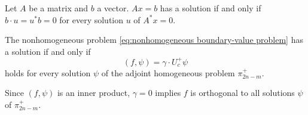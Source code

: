 \documentclass[11pt, oneside, a4paper]{article}
\begin{document}
\begin{prop}\label{prop:Ax=b has a solution iff condition}
    Let $A$ be a matrix and $b$ a vector. $Ax=b$ has a solution if and only if $b\cdot u=u^*b=0$ for every solution $u$ of $A^*x=0$.
\end{prop}

\begin{thm}\label{thm:nonhomogeneous problem has solution iff condition}
    The nonhomogeneous problem \ref{eq:nonhomogeneous boundary-value problem} has a solution if and only if
    \begin{equation}\label{eq:nonhomogeneous problem has solution iff condition}
        (f,\psi)=\gamma\cdot U_c^+\psi
    \end{equation}
    holds for every solution $\psi$ of the adjoint homogeneous problem $\pi_{2n-m}^+$.
\end{thm}
\begin{rmk}
    Since $(f,\psi)$ is an inner product, $\gamma=0$ implies $f$ is orthogonal to all solutions $\psi$ of $\pi_{2n-m}^+$.
\end{rmk}
\end{document}
